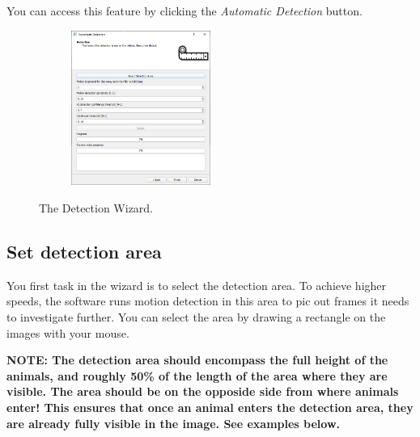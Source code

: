 \documentclass[10pt,a4paper,oneside]{report}             %
\begin{document}
You can access this feature by clicking the \textit{Automatic Detection} button.

\begin{figure}[H]
	\centering
	\begin{subfigure}{\textwidth}
		\centering 
		\includegraphics[width=0.5\textwidth]{./images/AutoDetect.png}
	\end{subfigure}
	\caption[]
	{\small  The Detection Wizard.}
\end{figure} 

\subsection{Set detection area}

You first task in the wizard is to select the detection area. To achieve higher speeds, the software runs motion detection in this area to pic out frames it needs to investigate further. You can select the area by drawing a rectangle on the images with your mouse. 

\textbf{NOTE: The detection area should encompass the full height of the animals, and roughly 50\% of the length of the area where they are visible. The area should be on the opposide side from where animals enter! This ensures that once an animal enters the detection area, they are already fully visible in the image. See examples below.}
\end{document}
